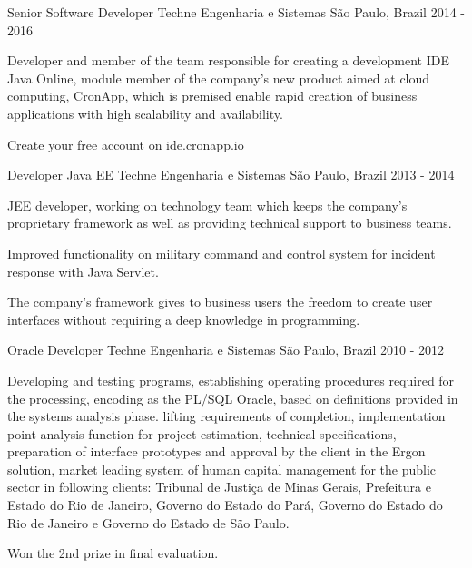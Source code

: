 \begin{cventries}
  \cventry
    {Senior Software Developer} %
    {Techne Engenharia e Sistemas} %
    {São Paulo, Brazil} %
    {2014 - 2016} %
    {
      \begin{cvitems} %
        \item {Developer and member of the team responsible for creating a development IDE Java Online, module member of the company's new product aimed at cloud computing, CronApp, which is premised enable rapid creation of business applications with high scalability and availability.}
        \item {Create your free account on ide.cronapp.io}
      \end{cvitems}
    }

  \cventry
    {Developer Java EE} %
    {Techne Engenharia e Sistemas} %
    {São Paulo, Brazil} %
    {2013 - 2014} %
    {
      \begin{cvitems} %
        \item {JEE developer, working on technology team which keeps the company's proprietary framework as well as providing technical support to business teams.}
        \item {Improved functionality on military command and control system for incident response with Java Servlet.}
        \item {The company's framework gives to business users the freedom to create user interfaces without requiring a deep knowledge in programming.}
      \end{cvitems}
    }

  \cventry
    {Oracle Developer} %
    {Techne Engenharia e Sistemas} %
	{São Paulo, Brazil} %
    {2010 - 2012} %
    {
      \begin{cvitems} %
        \item {Developing and testing programs, establishing operating procedures required for the processing, encoding as the PL/SQL Oracle, based on definitions provided in the systems analysis phase.
lifting requirements of completion, implementation point analysis function for project estimation, technical specifications, preparation of interface prototypes and approval by the client in the Ergon solution, market leading system of human capital management for the public sector in following clients: Tribunal de Justiça de Minas Gerais, Prefeitura e Estado do Rio de Janeiro, Governo do Estado do Pará, Governo do Estado do Rio de Janeiro e Governo do Estado de São Paulo.}
        \item {Won the 2nd prize in final evaluation.}
      \end{cvitems}
    }


\end{cventries}
